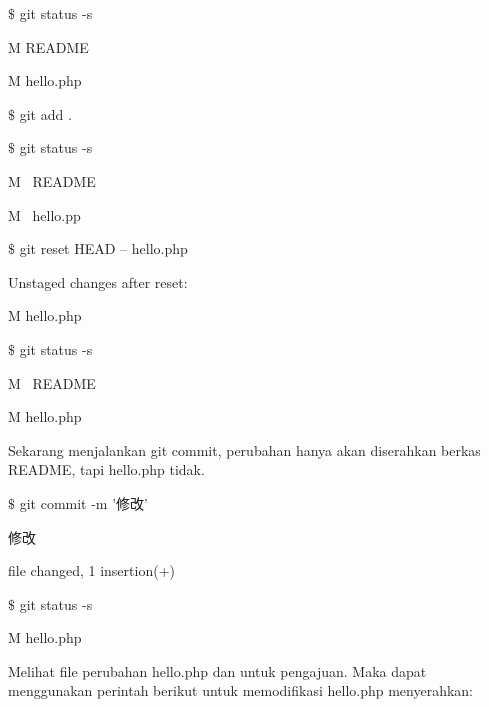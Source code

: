 \noindent 
{\fontsize{10pt}{10pt}\selectfont  $  \$  $ git status -s} \par
\noindent 
{\fontsize{10pt}{10pt}\selectfont  M README} \par
\noindent 
{\fontsize{10pt}{10pt}\selectfont  M hello.php} \par
\noindent 
{\fontsize{10pt}{10pt}\selectfont  $  \$  $ git add .} \par
\noindent 
{\fontsize{10pt}{10pt}\selectfont  $  \$  $ git status -s} \par
\noindent 
{\fontsize{10pt}{10pt}\selectfont M~ README} \par
\noindent 
{\fontsize{10pt}{10pt}\selectfont M~ hello.pp} \par
\noindent 
{\fontsize{10pt}{10pt}\selectfont  $  \$  $ git reset HEAD -- hello.php } \par
\noindent 
{\fontsize{10pt}{10pt}\selectfont Unstaged changes after reset:} \par
\noindent 
{\fontsize{10pt}{10pt}\selectfont M \hspace*{0.64in} hello.php} \par
\noindent 
{\fontsize{10pt}{10pt}\selectfont  $  \$  $ git status -s} \par
\noindent 
{\fontsize{10pt}{10pt}\selectfont M~ README} \par
\noindent 
{\fontsize{10pt}{10pt}\selectfont  M hello.php} \par
\vspace{12pt}
\hspace*{0.5in} Sekarang menjalankan git commit, perubahan hanya akan diserahkan berkas README, tapi hello.php tidak.  \par
\noindent 
{\fontsize{10pt}{10pt}\selectfont  $  \$  $ git commit -m '修改'} \par
\noindent 
{\fontsize{10pt}{10pt} 修改} \par
\noindent 
{\fontsize{10pt}{10pt} file changed, 1 insertion(+)} \par
\noindent 
{\fontsize{10pt}{10pt}\selectfont  $  \$  $ git status -s} \par
\noindent 
{\fontsize{10pt}{10pt}\selectfont  M hello.php} \par
\vspace{12pt}
\hspace*{0.5in} Melihat file perubahan hello.php dan untuk pengajuan. Maka dapat menggunakan perintah berikut untuk memodifikasi hello.php menyerahkan:  \par
